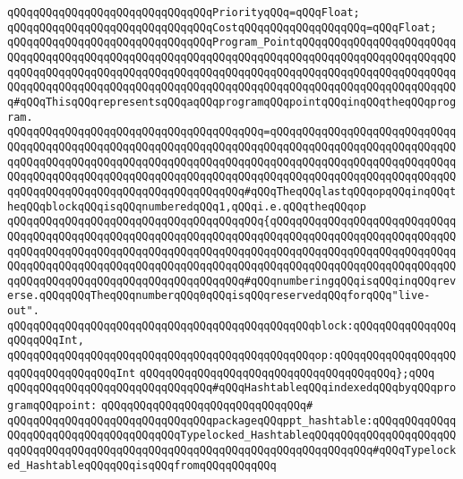 \newline
\verb|qQQqqQQqqQQqqQQqqQQqqQQqqQQqqQQqPriorityqQQq=qQQqFloat;|\newline
\verb|qQQqqQQqqQQqqQQqqQQqqQQqqQQqqQQqCostqQQqqQQqqQQqqQQqqQQq=qQQqFloat;|\newline
\newline
\verb|qQQqqQQqqQQqqQQqqQQqqQQqqQQqqQQqProgram_PointqQQqqQQqqQQqqQQqqQQqqQQqqQQqqQQqqQQqqQQqqQQqqQQqqQQqqQQqqQQqqQQqqQQqqQQqqQQqqQQqqQQqqQQqqQQqqQQqqQQqqQQqqQQqqQQqqQQqqQQqqQQqqQQqqQQqqQQqqQQqqQQqqQQqqQQqqQQqqQQqqQQqqQQqqQQqqQQqqQQqqQQqqQQqqQQqqQQqqQQqqQQqqQQqqQQqqQQqqQQqqQQqqQQqqQQqqQQq#qQQqThisqQQqrepresentsqQQqaqQQqprogramqQQqpointqQQqinqQQqtheqQQqprogram.|\newline
\verb|qQQqqQQqqQQqqQQqqQQqqQQqqQQqqQQqqQQqqQQq=qQQqqQQqqQQqqQQqqQQqqQQqqQQqqQQqqQQqqQQqqQQqqQQqqQQqqQQqqQQqqQQqqQQqqQQqqQQqqQQqqQQqqQQqqQQqqQQqqQQqqQQqqQQqqQQqqQQqqQQqqQQqqQQqqQQqqQQqqQQqqQQqqQQqqQQqqQQqqQQqqQQqqQQqqQQqqQQqqQQqqQQqqQQqqQQqqQQqqQQqqQQqqQQqqQQqqQQqqQQqqQQqqQQqqQQqqQQqqQQqqQQqqQQqqQQqqQQqqQQqqQQqqQQqqQQqqQQq#qQQqTheqQQqlastqQQqopqQQqinqQQqtheqQQqblockqQQqisqQQqnumberedqQQq1,qQQqi.e.qQQqtheqQQqop|\newline
\verb|qQQqqQQqqQQqqQQqqQQqqQQqqQQqqQQqqQQqqQQq{qQQqqQQqqQQqqQQqqQQqqQQqqQQqqQQqqQQqqQQqqQQqqQQqqQQqqQQqqQQqqQQqqQQqqQQqqQQqqQQqqQQqqQQqqQQqqQQqqQQqqQQqqQQqqQQqqQQqqQQqqQQqqQQqqQQqqQQqqQQqqQQqqQQqqQQqqQQqqQQqqQQqqQQqqQQqqQQqqQQqqQQqqQQqqQQqqQQqqQQqqQQqqQQqqQQqqQQqqQQqqQQqqQQqqQQqqQQqqQQqqQQqqQQqqQQqqQQqqQQqqQQqqQQqqQQqqQQq#qQQqnumberingqQQqisqQQqinqQQqreverse.qQQqqQQqTheqQQqnumberqQQq0qQQqisqQQqreservedqQQqforqQQq"live-out".|\newline
\verb|qQQqqQQqqQQqqQQqqQQqqQQqqQQqqQQqqQQqqQQqqQQqqQQqblock:qQQqqQQqqQQqqQQqqQQqqQQqInt,|\newline
\verb|qQQqqQQqqQQqqQQqqQQqqQQqqQQqqQQqqQQqqQQqqQQqqQQqop:qQQqqQQqqQQqqQQqqQQqqQQqqQQqqQQqqQQqInt|\newline
\verb|qQQqqQQqqQQqqQQqqQQqqQQqqQQqqQQqqQQqqQQq};qQQq|\newline
\newline
\verb|qQQqqQQqqQQqqQQqqQQqqQQqqQQqqQQq#qQQqHashtableqQQqindexedqQQqbyqQQqprogramqQQqpoint:|\newline
\verb|qQQqqQQqqQQqqQQqqQQqqQQqqQQqqQQq#|\newline
\verb|qQQqqQQqqQQqqQQqqQQqqQQqqQQqqQQqpackageqQQqppt_hashtable:qQQqqQQqqQQqqQQqqQQqqQQqqQQqqQQqqQQqqQQqTypelocked_HashtableqQQqqQQqqQQqqQQqqQQqqQQqqQQqqQQqqQQqqQQqqQQqqQQqqQQqqQQqqQQqqQQqqQQqqQQqqQQqqQQq#qQQqTypelocked_HashtableqQQqqQQqisqQQqfromqQQqqQQqqQQq|\newline
